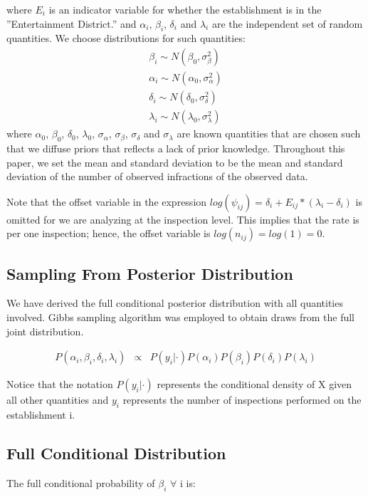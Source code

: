 \documentclass[twoside,onecolumn]{article}
\begin{document}
where $E_{i}$ is an indicator variable for whether the establishment is in the ''Entertainment District.'' and $\alpha_i$, $\beta_i$, $\delta_i$ and $\lambda_i$ are the independent set of random quantities. We choose distributions for such quantities:
$$
\begin{array}{rcl}
\beta_i \sim N(\beta_0, \sigma_{\beta}^2) \\
\alpha_i \sim N(\alpha_0, \sigma_{\alpha}^2) \\
\delta_i \sim N(\delta_0, \sigma_{\delta}^2) \\
\lambda_i \sim N(\lambda_0, \sigma_{\lambda}^2)
\end{array}
$$
where  $\alpha_0$, $\beta_0$, $\delta_0$, $\lambda_0$, $\sigma_\alpha$, $\sigma_\beta$, $\sigma_{\delta}$ and $\sigma_\lambda$ are known quantities that are chosen such that we diffuse priors that reflects a lack of prior knowledge. Throughout this paper, we set the mean and standard deviation to be the mean and standard deviation of the number of observed infractions of the observed data.

Note that the offset variable in the expression $log(\psi_{ij}) = \delta_i + E_{ij}*(\lambda_i - \delta_i)$ is omitted for we are analyzing at the inspection level. This implies that the rate is per one inspection; hence, the offset variable is $log(n_{ij}) = log(1) = 0$.

\subsection{Sampling From Posterior Distribution}
We have derived the full conditional posterior distribution with all quantities involved. Gibbs sampling algorithm was employed to obtain draws from the full joint distribution.

$$
\begin{array}{rcl}
P(\alpha_i,\beta_i,\delta_i,\lambda_i) &\propto& P(y_i | \cdot) P(\alpha_i) P(\beta_i) P(\delta_i) P(\lambda_i)
\end{array}
$$

Notice that the notation $P(y_i | \cdot)$ represents the conditional density of X given all other quantities and $y_i$ represents the number of inspections performed on the establishment i.

\subsection{Full Conditional Distribution}
The full conditional probability of $\beta_i$ $\forall$ i is:
\end{document}
